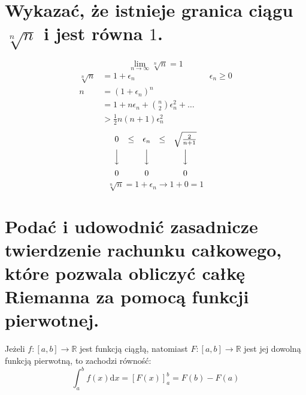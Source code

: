 \documentclass{article}
\numberwithin{equation}{section}
\theoremstyle{definition}
\theoremstyle{case}
\newcommand*{\R}{\mathbb{R}}
\begin{document}
\section{Wykazać, że istnieje granica ciągu \texorpdfstring{$\sqrt[n]{n}$}{n\textasciicircum(1/n)} i jest równa $1$.}
\begin{equation*}
	\lim_{n\to\infty} \sqrt[n]{n} = 1
\end{equation*}
\begin{align*}
	\sqrt[n]{n} &= 1 + \epsilon_n & \quad \epsilon_n \geq 0
	\\ n &= (1+\epsilon_n)^n
	\\ &= 1 + n\epsilon_n + \binom{n}{2}\epsilon_n^2 + \dots
	\\ &> \frac{1}{2}n(n+1)\epsilon_n^2
\end{align*}
\begin{equation*}
	\begin{CD}
		0 @. \quad \leq \quad @. \epsilon_n @. \quad \leq \quad @. \sqrt{\frac{2}{n+1}} \\
		@VVV  @. @VVV @. @VVV \\
		0 @. @. 0 @. @. 0
	\end{CD}
\end{equation*}
\begin{equation*}
	\sqrt[n]{n} = 1 + \epsilon_n \to 1+0 = 1
\end{equation*}

\setcounter{section}{63}
\section{Podać i udowodnić zasadnicze twierdzenie rachunku całkowego,
które pozwala obliczyć całkę Riemanna za pomocą funkcji pierwotnej.}
Jeżeli ${f \colon [a,b] \to \R}$ jest funkcją ciągłą, natomiast ${F \colon [a,b] \to \R}$
jest jej dowolną funkcją pierwotną, to zachodzi równość:
\begin{equation*}
	\int_a^b f(x) \mathrm{d}x = [ F(x) ]_a^b = F(b) - F(a)
\end{equation*}
\end{document}
